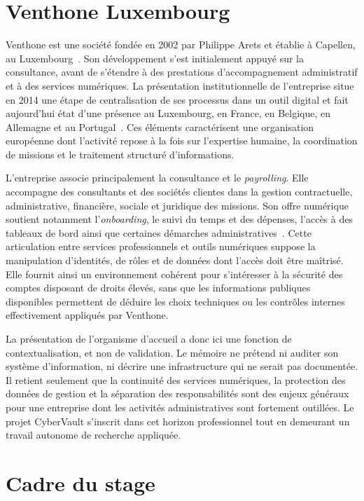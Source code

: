\documentclass[11pt,a4paper,oneside]{report}
\theoremstyle{definition}
\theoremstyle{plain}
\begin{document}
\section{Venthone Luxembourg}
\label{sec:intro-venthone}

Venthone est une société fondée en 2002 par Philippe Arets et établie à
Capellen, au Luxembourg~\cite{paperjam2026venthone}. Son développement s'est
initialement appuyé sur la consultance, avant de s'étendre à des prestations
d'accompagnement administratif et à des services numériques. La présentation
institutionnelle de l'entreprise situe en 2014 une étape de centralisation de
ses processus dans un outil digital et fait aujourd'hui état d'une présence au
Luxembourg, en France, en Belgique, en Allemagne et au
Portugal~\cite{venthone2026about,venthone2026home}. Ces éléments caractérisent
une organisation européenne dont l'activité repose à la fois sur l'expertise
humaine, la coordination de missions et le traitement structuré
d'informations.

L'entreprise associe principalement la consultance et le
\emph{payrolling}. Elle accompagne des consultants et des sociétés clientes
dans la gestion contractuelle, administrative, financière, sociale et
juridique des missions. Son offre numérique soutient notamment
l'\emph{onboarding}, le suivi du temps et des dépenses, l'accès à des tableaux
de bord ainsi que certaines démarches administratives~\cite{venthone2026home}.
Cette articulation entre services professionnels et outils numériques suppose
la manipulation d'identités, de rôles et de données dont l'accès doit être
maîtrisé. Elle fournit ainsi un environnement cohérent pour s'intéresser à la
sécurité des comptes disposant de droits élevés, sans que les informations
publiques disponibles permettent de déduire les choix techniques ou les
contrôles internes effectivement appliqués par Venthone.

La présentation de l'organisme d'accueil a donc ici une fonction de
contextualisation, et non de validation. Le mémoire ne prétend ni auditer son
système d'information, ni décrire une infrastructure qui ne serait pas
documentée. Il retient seulement que la continuité des services numériques, la
protection des données de gestion et la séparation des responsabilités sont
des enjeux généraux pour une entreprise dont les activités administratives
sont fortement outillées. Le projet CyberVault s'inscrit dans cet horizon
professionnel tout en demeurant un travail autonome de recherche appliquée.

\section{Cadre du stage}
\label{sec:intro-stage}
\end{document}
